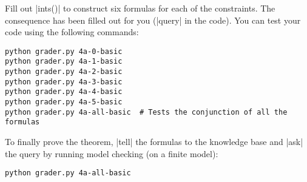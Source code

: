 \item {}
Fill out |ints()| to construct six formulas for each of the constraints.  The
consequence has been filled out for you (|query| in the code). You can test your
code using the following commands:
\begin{lstlisting}
python grader.py 4a-0-basic
python grader.py 4a-1-basic
python grader.py 4a-2-basic
python grader.py 4a-3-basic
python grader.py 4a-4-basic
python grader.py 4a-5-basic
python grader.py 4a-all-basic  # Tests the conjunction of all the formulas
\end{lstlisting}

To finally prove the theorem, |tell| the formulas to the knowledge base and
|ask| the query by running model checking (on a finite model):
\begin{lstlisting}
python grader.py 4a-all-basic
\end{lstlisting}

